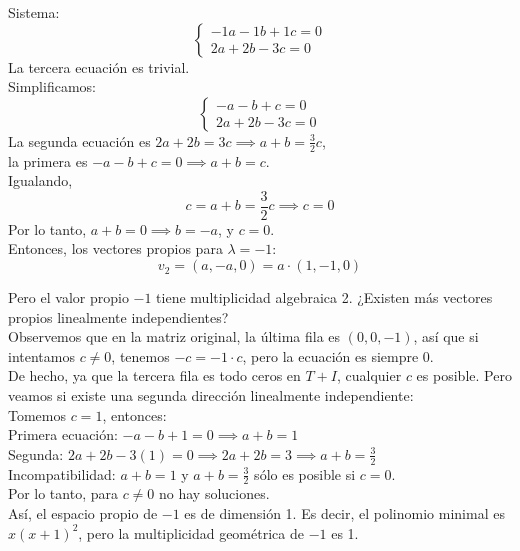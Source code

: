 \documentclass{article}
\theoremstyle{nonumberplain}
\begin{document}
Sistema:
\[
\begin{cases}
-1 a - 1 b + 1 c = 0 \\
2 a + 2 b - 3 c = 0
\end{cases}
\]
La tercera ecuación es trivial.\\

Simplificamos:
\[
\begin{cases}
-a - b + c = 0 \\
2a + 2b - 3c = 0
\end{cases}
\]
La segunda ecuación es \( 2a + 2b = 3c \implies a + b = \frac{3}{2}c \),  \\
la primera es \( -a - b + c = 0 \implies a + b = c \).\\

Igualando,
\[
c = a + b = \frac{3}{2}c \implies c = 0
\]
Por lo tanto, \( a + b = 0 \implies b = -a \), y \( c = 0 \).\\

Entonces, los vectores propios para \( \lambda = -1 \):
\[
v_2 = (a, -a, 0) = a \cdot (1, -1, 0)
\]

Pero el valor propio \( -1 \) tiene multiplicidad algebraica 2. ¿Existen más vectores propios linealmente independientes? \\

Observemos que en la matriz original, la última fila es \( (0, 0, -1) \), así que si intentamos \( c \neq 0 \), tenemos \( -c = -1 \cdot c \), pero la ecuación es siempre \( 0 \).\\

De hecho, ya que la tercera fila es todo ceros en \( T + I \), cualquier \( c \) es posible. Pero veamos si existe una segunda dirección linealmente independiente:\\

Tomemos \( c = 1 \), entonces:\\

Primera ecuación: \( -a - b + 1 = 0 \implies a + b = 1 \)\\

Segunda: \( 2a + 2b - 3(1) = 0 \implies 2a + 2b = 3 \implies a + b = \frac{3}{2} \) \\

Incompatibilidad: \( a + b = 1 \) y \( a + b = \frac{3}{2} \) sólo es posible si \( c = 0 \).  \\
Por lo tanto, para \( c \neq 0 \) no hay soluciones. \\

Así, el espacio propio de \( -1 \) es de dimensión 1. Es decir, el polinomio minimal es \( x(x+1)^2 \), pero la multiplicidad geométrica de \( -1 \) es 1. \\
\end{document}
